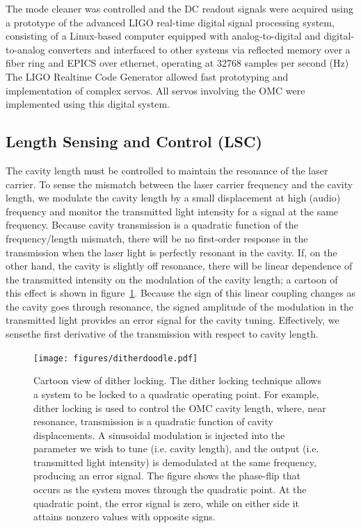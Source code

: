 The mode cleaner was controlled and the DC readout signals were
acquired using a prototype of the advanced LIGO real-time digital
signal processing system, consisting of a Linux-based computer
equipped with analog-to-digital and digital-to-analog converters and
interfaced to other systems via reflected memory over a fiber ring and
EPICS over ethernet, operating at 32768 samples per second (Hz) The
LIGO Realtime Code Generator\cite{Bork2009ELIGO,Bork2009AdvLigo}
allowed fast prototyping and implementation of complex servos.  All
servos involving the OMC were implemented using this digital system.

\subsection{Length Sensing and Control (LSC)}

The cavity length must be controlled to maintain the resonance of the
laser carrier.  To sense the mismatch between the laser carrier frequency and
the cavity length, we modulate the cavity length by a small
displacement at high (audio) frequency and monitor the transmitted light
intensity for a signal at the same frequency.   Because cavity transmission is
a quadratic function of the frequency/length mismatch, there will be no
first-order response in the transmission when the laser light is perfectly
resonant in the cavity.  If, on the other hand, the cavity is slightly off
resonance, there will be linear dependence of the transmitted intensity on
the modulation of the cavity length; a cartoon of this effect is shown in
figure~\ref{fig:dither-doodle}.
Because the sign of this linear coupling
changes as the cavity goes through resonance, the signed amplitude of the
modulation in the transmitted light provides an error signal for the cavity
tuning. Effectively, we sensethe first derivative of the transmission with
respect to cavity length.

\begin{figure}[t]
\centerline{\texttt{[image: figures/ditherdoodle.pdf]}}
\caption[Cartoon view of dither locking]{\label{fig:dither-doodle}Cartoon view of dither locking.  The dither locking technique allows a system to be locked to a quadratic operating point.  For example, dither locking is used to control the OMC cavity length, where, near resonance, transmission is a quadratic function of cavity displacements.  A sinusoidal modulation is injected into the parameter we wish to tune (i.e. cavity length), and the output (i.e. transmitted light intensity) is demodulated at the same frequency, producing an error signal.  The figure shows the phase-flip that occurs as the system moves through the quadratic point.  At the quadratic point, the error signal is zero, while on either side it attains nonzero values with opposite signs.}
\end{figure}

